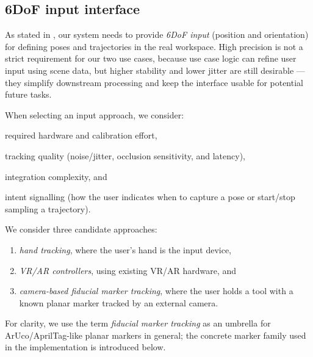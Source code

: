 \subsection{6DoF input interface} \label{subsec:ch2_analysis_6DoF_input_interface}

As stated in , our system needs to provide \emph{6DoF input} (position and orientation) for defining poses and trajectories in the real workspace. High precision is not a strict requirement for our two use cases, because use case logic can refine user input using scene data, but higher stability and lower jitter are still desirable --- they simplify downstream processing and keep the interface usable for potential future tasks.

When selecting an input approach, we consider:
\begin{enumerate*}[label=(\roman*)]
    \item required hardware and calibration effort,
    \item tracking quality (noise/jitter, occlusion sensitivity, and latency),
    \item integration complexity, and
    \item intent signalling (how the user indicates when to capture a pose or start/stop sampling a trajectory).
\end{enumerate*}

We consider three candidate approaches:
\begin{enumerate}[label=(\roman*), itemsep=0.2em]
    \item \emph{hand tracking}, where the user's hand is the input device,
    \item \emph{VR/AR controllers}, using existing VR/AR hardware, and
    \item \emph{camera-based fiducial marker tracking}, where the user holds a tool with a known planar marker tracked by an external camera.
\end{enumerate}

For clarity, we use the term \emph{fiducial marker tracking} as an umbrella for ArUco/AprilTag-like planar markers in general; the concrete marker family used in the implementation is introduced below.

